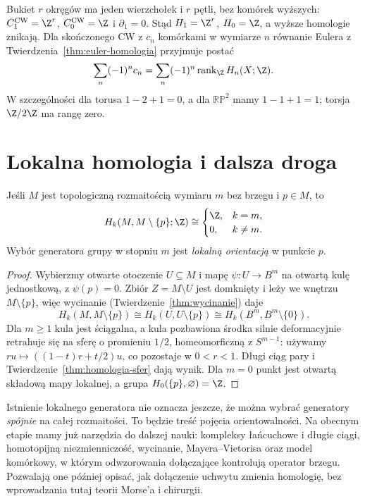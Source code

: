 \begin{przyklad}
\label{prz:homologia-bukiet}
Bukiet $r$ okręgów ma jeden
wierzchołek i $r$ pętli,
bez komórek wyższych:
$C_1^{\mathrm{CW}}=\Z^r$,
$C_0^{\mathrm{CW}}=\Z$ i
$\partial_1=0$.
Stąd $H_1=\Z^r$, $H_0=\Z$,
a wyższe homologie znikają.
Dla skończonego CW z
$c_n$ komórkami w wymiarze $n$
równanie Eulera z
Twierdzenia~\ref{thm:euler-homologia}
przyjmuje postać
\[
 \sum_n(-1)^n c_n
 =\sum_n(-1)^n
   \operatorname{rank}_{\Z} H_n(X;\Z).
\]
W szczególności dla torusa
$1-2+1=0$, a dla
$\mathbb{RP}^2$ mamy
$1-1+1=1$; torsja
$\Z/2\Z$ ma rangę zero.
\end{przyklad}

\section{Lokalna homologia i dalsza droga}
\label{sec:lokalna-homologia}

\begin{stwierdzenie}
\label{prop:lokalna-homologia}
Jeśli $M$ jest topologiczną
rozmaitością wymiaru $m$
bez brzegu i $p\in M$, to
\[
 H_k(M,M\setminus\{p\};\Z)
 \cong
 \begin{cases}\Z,&k=m,\\0,&k\ne m.\end{cases}
\]
Wybór generatora grupy w stopniu $m$
jest \emph{lokalną orientacją}
w punkcie $p$.
\end{stwierdzenie}
\begin{proof}
Wybierzmy otwarte otoczenie $U\subseteq M$ i mapę
$\psi:U\to B^m$ na otwartą kulę jednostkową,
z $\psi(p)=0$. Zbiór
$Z=M\setminus U$
jest domknięty i leży
we wnętrzu $M\setminus\{p\}$,
więc wycinanie
(Twierdzenie~\ref{thm:wycinanie})
daje
\[
 H_k(M,M\setminus\{p\})
 \cong H_k(U,U\setminus\{p\})
\cong H_k(B^m,B^m\setminus\{0\}).
\]
Dla $m\geq1$ kula jest
ściągalna, a kula pozbawiona
środka silnie deformacyjnie retrahuje się na sferę
o promieniu $1/2$, homeomorficzną z $S^{m-1}$:
używamy $ru\mapsto((1-t)r+t/2)u$, co pozostaje w $0<r<1$.
Długi ciąg pary i
Twierdzenie~\ref{thm:homologia-sfer}
dają wynik. Dla $m=0$
punkt jest otwartą składową
mapy lokalnej, a grupa
$H_0(\{p\},\varnothing)=\Z$.
\end{proof}

Istnienie lokalnego generatora
nie oznacza jeszcze, że można
wybrać generatory \emph{spójnie}
na całej rozmaitości. To będzie
treść pojęcia orientowalności.
Na obecnym etapie mamy
już narzędzia do dalszej nauki:
kompleksy łańcuchowe i długie ciągi,
homotopijną niezmienniczość,
wycinanie, Mayera--Vietorisa
oraz model komórkowy, w którym
odwzorowania dołączające kontrolują
operator brzegu. Pozwalają one
później opisać, jak dołączenie
uchwytu zmienia homologię,
bez wprowadzania tutaj
teorii Morse'a i chirurgii.

